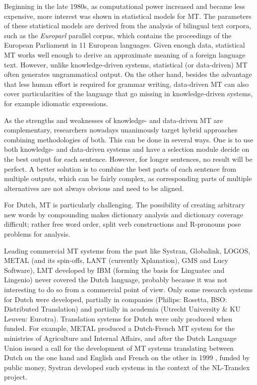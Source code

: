 \documentclass{scrartcl}
\begin{document}
\begin{Parallel}[c]{70mm}{70mm}
{    Beginning in the late 1980s, as computational power increased and became less expensive, more interest was shown in statistical models for MT. The parameters of these statistical models are derived from the analysis of bilingual text corpora, such as the \emph{Europarl} parallel corpus, which contains the proceedings of the European Parliament in 11 European languages. Given enough data, statistical MT works well enough to derive an approximate meaning of a foreign language text. However, unlike knowledge-driven systems, statistical (or data-driven) MT often generates ungrammatical output. On the other hand, besides the advantage that less human effort is required for grammar writing, data-driven MT can also cover particularities of the language that go missing in knowledge-driven systems, for example idiomatic expressions.

    As the strengths and weaknesses of knowledge- and data-driven MT are complementary, researchers nowadays unanimously target hybrid approaches combining methodologies of both. This can be done in several ways. One is to use both knowledge- and data-driven systems and have a selection module decide on the best output for each sentence. However, for longer sentences, no result will be perfect. A better solution is to combine the best parts of each sentence from multiple outputs, which can be fairly complex, as corresponding parts of multiple alternatives are not always obvious and need to be aligned.

    For Dutch, MT is particularly challenging. The possibility of creating arbitrary new words by compounding makes dictionary analysis and dictionary coverage difficult; rather free word order, split verb constructions and R-pronouns pose problems for analysis.

    Leading commercial MT systems from the past like Systran, Globalink, LOGOS, METAL (and its spin-offs, LANT (currently Xplanation), GMS and Lucy Software), LMT developed by IBM (forming the basis for Linguatec  and Lingenio) never covered the Dutch language, probably because it was not interesting to do so from a commercial point of view. Only some research systems for Dutch were developed, partially in companies (Philips: Rosetta, BSO: Distributed Translation) and partially in academia (Utrecht University \& KU Leuven: Eurotra). Translation systems for Dutch were only produced when funded. For example, METAL produced a Dutch-French MT system for the ministries of Agriculture and Internal Affairs, and after the Dutch Language Union issued a call for the development of MT systems translating between Dutch on the one hand and English and French on the other in 1999 \cite{Cucchiarini:etal:2000},  funded by public money, Systran developed such systems in the context of the NL-Translex project.

}
\end{Parallel}
\end{document}
